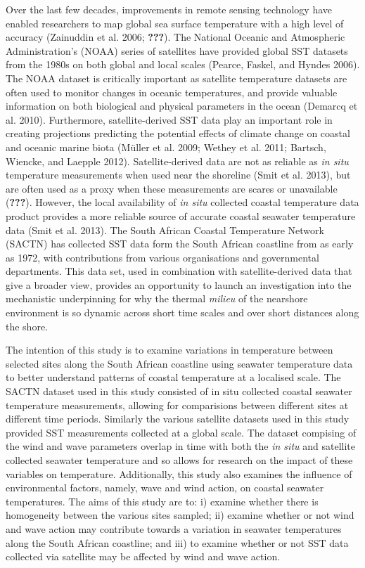 \documentclass[12pt,A4paper,]{article}
\begin{document}
Over the last few decades, improvements in remote sensing technology
have enabled researchers to map global sea surface temperature with a
high level of accuracy (Zainuddin et al. 2006; {\textbf{???}}). The
National Oceanic and Atmospheric Administration's (NOAA) series of
satellites have provided global SST datasets from the 1980s on both
global and local scales (Pearce, Faskel, and Hyndes 2006). The NOAA
dataset is critically important as satellite temperature datasets are
often used to monitor changes in oceanic temperatures, and provide
valuable information on both biological and physical parameters in the
ocean (Demarcq et al. 2010). Furthermore, satellite-derived SST data
play an important role in creating projections predicting the potential
effects of climate change on coastal and oceanic marine biota (Müller et
al. 2009; Wethey et al. 2011; Bartsch, Wiencke, and Laepple 2012).
Satellite-derived data are not as reliable as \emph{in situ} temperature
measurements when used near the shoreline (Smit et al. 2013), but are
often used as a proxy when these measurements are scares or unavailable
({\textbf{???}}). However, the local availability of \emph{in situ}
collected coastal temperature data product provides a more reliable
source of accurate coastal seawater temperature data (Smit et al. 2013).
The South African Coastal Temperature Network (SACTN) has collected SST
data form the South African coastline from as early as 1972, with
contributions from various organisations and governmental departments.
This data set, used in combination with satellite-derived data that give
a broader view, provides an opportunity to launch an investigation into
the mechanistic underpinning for why the thermal \emph{milieu} of the
nearshore environment is so dynamic across short time scales and over
short distances along the shore.

The intention of this study is to examine variations in temperature
between selected sites along the South African coastline using seawater
temperature data to better understand patterns of coastal temperature at
a localised scale. The SACTN dataset used in this study consisted of in
situ collected coastal seawater temperature measurements, allowing for
comparisions between different sites at different time periods.
Similarly the various satellite datasets used in this study provided SST
measurements collected at a global scale. The dataset compising of the
wind and wave parameters overlap in time with both the \emph{in situ}
and satellite collected seawater temperature and so allows for research
on the impact of these variables on temperature. Additionally, this
study also examines the influence of environmental factors, namely, wave
and wind action, on coastal seawater temperatures. The aims of this
study are to: i) examine whether there is homogeneity between the
various sites sampled; ii) examine whether or not wind and wave action
may contribute towards a variation in seawater temperatures along the
South African coastline; and iii) to examine whether or not SST data
collected via satellite may be affected by wind and wave action.
\end{document}

